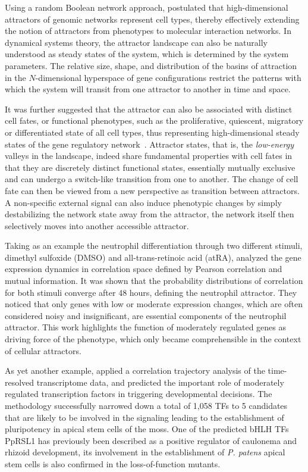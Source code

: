 Using a random Boolean network approach, \cite{Kauffman1969a} postulated that high-dimensional attractors of genomic networks represent cell types, thereby effectively
extending the notion of attractors from phenotypes to molecular interaction
networks.
In dynamical systems theory, the attractor landscape can also be naturally 
understood as steady states of the system, which is determined by the system 
parameters.
The relative size, shape, and distribution of the basins of
attraction in the $N$-dimensional hyperspace of gene configurations restrict the patterns with which the system will
transit from one attractor to another in time and space.

It was further suggested that the attractor can also be associated with distinct cell fates, or functional phenotypes, such as the proliferative, quiescent, migratory or differentiated state of all cell types, thus representing high-dimensional 
steady states of the gene regulatory network~\citep{Huang2006,Huang2005}.
Attractor states, that is, the \emph{low-energy} valleys in the landscape, indeed share fundamental properties with cell fates in that they are discretely distinct functional states, essentially mutually exclusive and can undergo a switch-like transition from one to another. The change of cell fate can then be viewed from a new
perspective as transition between
attractors. A non-specific external signal can also induce phenotypic changes by
simply destabilizing the network state 
away from the attractor, the network itself then selectively moves into another
accessible attractor.

Taking as an example the neutrophil differentiation through two different stimuli, dimethyl sulfoxide (DMSO) and all-trans-retinoic acid (atRA), \cite{Tsuchiya2010}
analyzed the gene expression dynamics in correlation space defined by Pearson correlation and mutual information. It was shown that the probability distributions of
correlation for both stimuli converge after 48 hours, defining the neutrophil attractor. They noticed that only genes with low or moderate expression changes, which are often considered noisy and insignificant, are essential components of the neutrophil attractor. This work highlights the function of moderately regulated genes as 
driving force of the phenotype, which only became comprehensible in the context
of cellular attractors.

As yet another example, \cite{Busch2013} applied a correlation trajectory analysis of the 
time-resolved transcriptome data, and predicted the important role of 
moderately regulated transcription factors in triggering developmental 
decisions. The methodology successfully narrowed down a total of 1,058 TFs to 
5 candidates that are likely to be involved in the signaling leading to the establishment of pluripotency in apical stem cells of the moss. One of the predicted bHLH TFs PpRSL1 has previously been described as a positive regulator of caulonema and rhizoid development, 
its involvement in the establishment of \emph{P. patens} apical stem cells is also confirmed
in the loss-of-function mutants.

